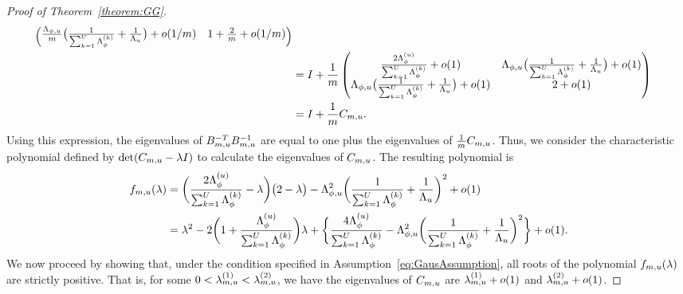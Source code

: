 \begin{proof}[Proof of Theorem~\ref{theorem:GG}]
\begin{align*}
\begin{pmatrix}
  \frac{\Lambda_{\phi, u}}{m} \big(\frac{1}{\sum_{k = 1}^U\Lambda^{(k)}_{\phi}} + \frac{1}{\Lambda_u}\big) + o(1/m) & 1 + \frac{2}{m} + o(1/m) \end{pmatrix} \\
  &= I + \frac{1}{m}\begin{pmatrix} \frac{2\Lambda^{(u)}_{\phi}}{\sum_{k = 1}^U\Lambda^{(k)}_{\phi}} + o(1) & \Lambda_{\phi, u} \big(\frac{1}{\sum_{k = 1}^U\Lambda^{(k)}_{\phi}} + \frac{1}{\Lambda_u}\big) + o(1)\\ 
  \Lambda_{\phi, u} \big(\frac{1}{\sum_{k = 1}^U\Lambda^{(k)}_{\phi}} + \frac{1}{\Lambda_u}\big) + o(1) & 2 + o(1) \end{pmatrix} \\
  &= I + \frac{1}{m}C_{m, u}.
\end{align*}
Using this expression, the eigenvalues of $B^{-T}_{m, u}B^{-1}_{m, u}$ are equal to one plus the eigenvalues of $\frac{1}{m}C_{m, u}$. 
Thus, we consider the characteristic polynomial defined by $\det (C_{m, u} - \lambda I)$ to calculate the eigenvalues of $C_{m, u}$. The resulting polynomial is
\begin{align*}
f_{m, u}(\lambda) &=
  \bigg(
    \frac{2\Lambda^{(u)}_{\phi}}{\sum_{k = 1}^U\Lambda^{(k)}_{\phi}} - \lambda\bigg)
  \big(2 - \lambda\big) -
  \Lambda_{\phi, u}^2
  \bigg(
    \frac{1}{\sum_{k = 1}^U\Lambda^{(k)}_{\phi}} + \frac{1}{\Lambda_u}
  \bigg)^2 + o(1)
  \\
  &= \lambda^2 -
  2\bigg(
    1 + \frac{\Lambda^{(u)}_{\phi}}{\sum_{k = 1}^U\Lambda^{(k)}_{\phi}}
  \bigg)
  \lambda +
  \bigg\{
    \frac{4\Lambda^{(u)}_{\phi}}{\sum_{k = 1}^U\Lambda^{(k)}_{\phi}}
    - \Lambda_{\phi, u}^2
    \bigg(
      \frac{1}{\sum_{k = 1}^U\Lambda^{(k)}_{\phi}} + \frac{1}{\Lambda_u}
    \bigg)^2
  \bigg\} + o(1).
\end{align*}
We now proceed by showing that, under the condition specified in Assumption~\ref{eq:GausAssumption}, all roots of the polynomial $f_{m, u}(\lambda)$ are strictly positive. 
That is, for some $0 < \lambda^{(1)}_{m, u} < \lambda^{(2)}_{m, u}$, we have the eigenvalues of $C_{m, u}$ are $\lambda^{(1)}_{m, u} + o(1)$ and $\lambda^{(2)}_{m, u} + o(1)$. 


\end{proof}
